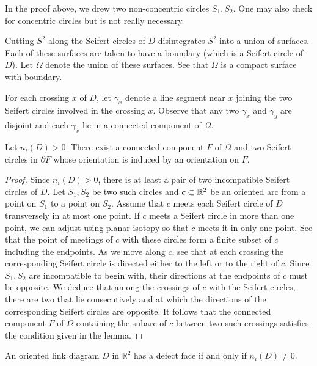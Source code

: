 \begin{remark}
\label{sec:artin-braid-group-17}
  In the proof above, we drew two non-concentric circles $S_1, S_2$. One may also check for concentric circles but is not really necessary.
\end{remark}

Cutting $S^2$ along the Seifert circles of $D$ disintegrates $S^2$ into a union of surfaces. Each of these surfaces are taken to have a boundary (which is a Seifert circle of $D$). Let $\Omega$ denote the union of these surfaces. See that $\Omega$ is a compact surface with boundary.

For each crossing $x$ of $D$, let $\gamma_{x}$ denote a line segment near $x$ joining the two Seifert circles involved in the crossing $x$. Observe that any two $\gamma_x$ and $\gamma_y$ are disjoint and each $\gamma_x$ lie in a connected component of $\Omega$.

\begin{lemma}
\label{sec:artin-braid-group-18}
Let $n_i(D) > 0$. There exist a connected component $F$ of $\Omega$ and two Seifert circles in $\partial F$ whose orientation is induced by an orientation on $F$.
\end{lemma}

\begin{proof}
  Since $n_i(D) > 0$, there is at least a pair of two incompatible Seifert circles of $D$. Let $S_1, S_2$ be two such circles and $c \subset \mathbb{R}^2$ be an oriented arc from a point on $S_1$ to a point on $S_2$. Assume that $c$ meets each Seifert circle of $D$ transversely in at most one point. If $c$ meets a Seifert circle in more than one point, we can adjust using planar isotopy so that $c$ meets it in only one point. See that the point of meetings of $c$ with these circles form a finite subset of $c$ including the endpoints. As we move along $c$, see that at each crossing the corresponding Seifert circle is directed either to the left or to the right of $c$. Since $S_1, S_2$ are incompatible to begin with, their directions at the endpoints of $c$ must be opposite. We deduce that among the crossings of $c$ with the Seifert circles, there are two that lie consecutively and at which the directions of the corresponding Seifert circles are opposite. It follows that the connected component $F$ of $\Omega$ containing the subarc of $c$ between two such crossings satisfies the condition given in the lemma.
\end{proof}

\begin{lemma}
  \label{l2}
An oriented link diagram $D$ in $\mathbb{R}^2$ has a defect face if and only if $n_i(D) \ne 0$.
\end{lemma}

